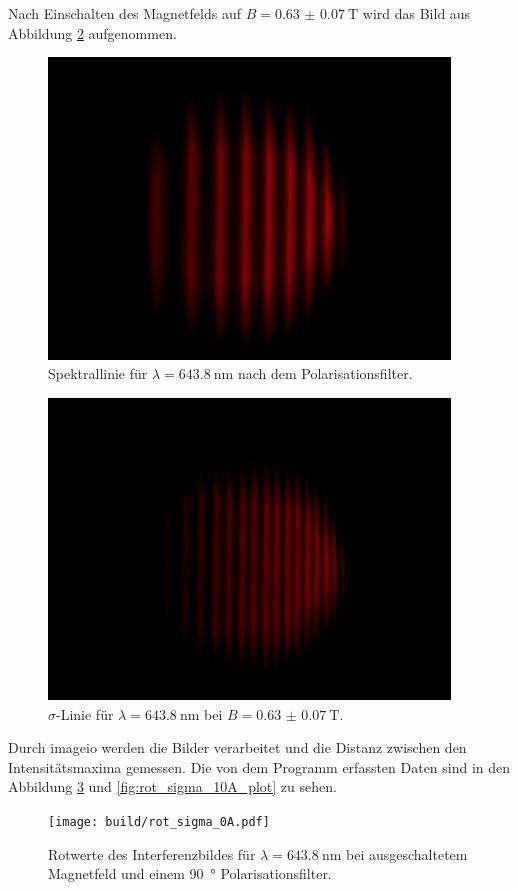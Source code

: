 Nach Einschalten des Magnetfelds auf $B=\SI{0.63(7)}{\tesla}$ wird das Bild aus Abbildung \ref{fig:rot_sigma_10A} aufgenommen.
\begin{figure}[htb]
  \centering
  \includegraphics[height=8cm]{content/pictures/rot_sigma_0A.png}
  \caption{Spektrallinie für $\lambda=\SI{643.8}{\nano\meter}$ nach dem Polarisationsfilter.}
  \label{fig:rot_sigma_0A}
\end{figure}
\begin{figure}[htb]
  \centering
  \includegraphics[height=8cm]{content/pictures/rot_sigma_10A.png}
  \caption{$\sigma$-Linie für $\lambda=\SI{643.8}{\nano\meter}$ bei $B=\SI{0.63(7)}{\tesla}$.}
  \label{fig:rot_sigma_10A}
\end{figure}
Durch imageio \cite{imageio} werden die Bilder verarbeitet und die Distanz zwischen den Intensitätsmaxima gemessen.
Die von dem Programm erfassten Daten sind in den Abbildung \ref{fig:rot_sigma_0A_plot} und \ref{fig:rot_sigma_10A_plot} zu sehen.
\begin{figure}[htb]
  \centering
  \texttt{[image: build/rot\_sigma\_0A.pdf]}
  \caption{Rotwerte des Interferenzbildes für $\lambda=\SI{643.8}{\nano\meter}$ bei ausgeschaltetem Magnetfeld und einem \SI{90}{\degree} Polarisationsfilter.}
  \label{fig:rot_sigma_0A_plot}
\end{figure}
